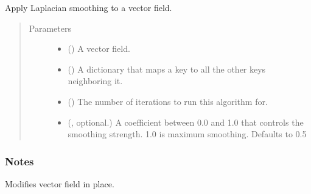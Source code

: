 \documentclass[letterpaper,10pt,english]{sphinxmanual}
\begin{document}
\begin{fulllineitems}
\label{\detokenize{api/generated/directional_clustering.transformations.smoothen_vector_field:directional_clustering.transformations.smoothen_vector_field}}
Apply Laplacian smoothing to a vector field.
\begin{quote}\begin{description}
\item[{Parameters}] \leavevmode\begin{itemize}
\item {} 
 () \textendash{} A vector field.

\item {} 
 () \textendash{} A dictionary that maps a key to all the other keys neighboring it.

\item {} 
 () \textendash{} The number of iterations to run this algorithm for.

\item {} 
 (, optional.) \textendash{} A coefficient between 0.0 and 1.0 that controls the smoothing strength.
1.0 is maximum smoothing.
Defaults to 0.5

\end{itemize}

\end{description}\end{quote}
\subsubsection*{Notes}

Modifies vector field in place.

\end{fulllineitems}
\end{document}
